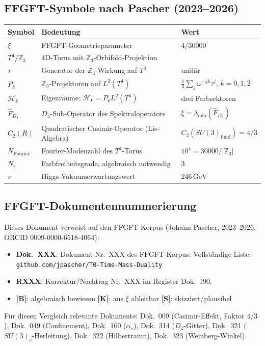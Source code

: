 \subsection*{FFGFT-Symbole nach Pascher (2023--2026)}

\begin{center}
\begin{tabular}{lll}
\toprule
Symbol & Bedeutung & Wert \\
\midrule
$\xi$ & FFGFT-Geometrieparameter & $4/30000$ \\
$T^4/\mathbb{Z}_3$ & 4D-Torus mit $\mathbb{Z}_3$-Orbifold-Projektion & \\
$\tau$ & Generator der $\mathbb{Z}_3$-Wirkung auf $T^4$ & unitär \\
$P_k$ & $\mathbb{Z}_3$-Projektoren auf $L^2(T^4)$ &
  $\frac{1}{3}\sum_j\omega^{-jk}\tau^j$, $k=0,1,2$ \\
$\mathcal{H}_k$ & Eigenräume: $\mathcal{H}_k = P_k L^2(T^4)$ &
  drei Farbsektoren \\
$\hat{F}_{D_4}$ & $D_4$-Sub-Operator des Spektraloperators &
  $\xi = \lambda_{\min}(\hat{F}_{D_4})$ \\
$C_2(R)$ & Quadratischer Casimir-Operator (Lie-Algebra) &
  $C_2(SU(3)_{\text{fund}}) = 4/3$ \\
$N_{\text{Fourier}}$ & Fourier-Modenzahl des $T^4$-Torus &
  $10^4 = 30000/|\mathbb{Z}_3|$ \\
$N_c$ & Farbfreiheitsgrade, algebraisch notwendig & $3$ \\
$v$ & Higgs-Vakuumerwartungswert & $246\,\text{GeV}$ \\
\bottomrule
\end{tabular}
\end{center}

\subsection*{FFGFT-Dokumentennummerierung}

Dieses Dokument verweist auf den FFGFT-Korpus (Johann Pascher,
2023--2026, ORCID 0009-0000-6518-4064):
\begin{itemize}
  \item \textbf{Dok.~XXX}: Dokument Nr.~XXX des FFGFT-Korpus.
    Vollständige Liste: \texttt{github.com/jpascher/T0-Time-Mass-Duality}
  \item \textbf{RXXX}: Korrektur/Nachtrag Nr.~XXX im Register Dok.~190.
  \item \textbf{[B]}: algebraisch bewiesen \quad
    \textbf{[K]}: aus $\xi$ ableitbar \quad
    \textbf{[S]}: skizziert/plausibel
\end{itemize}
Für diesen Vergleich relevante Dokumente: Dok.~009 (Casimir-Effekt,
Faktor $4/3$), Dok.~049 (Confinement), Dok.~160 ($\alpha_s$),
Dok.~314 ($D_4$-Gitter), Dok.~321 ($SU(3)_c$-Herleitung),
Dok.~322 (Hilbertraum), Dok.~323 (Weinberg-Winkel).


